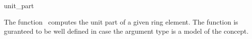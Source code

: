 \begin{ccRefFunction}{unit_part}

\ccDefinition

The function \ccRefName\ computes the unit part of a given ring 
element. 
The function is guranteed to be well defined in case the argument type 
is a model of the  concept. 


{}


\ccSeeAlso

\\
\\

\end{ccRefFunction}
